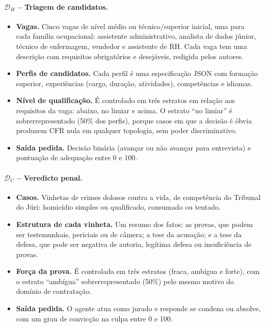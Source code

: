 \documentclass[12pt]{article}
\begin{document}
\paragraph{$\mathcal{D}_H$ -- Triagem de candidatos.}
\begin{itemize}
    \item \textbf{Vagas.} Cinco vagas de nível médio ou técnico/superior inicial, uma para cada família ocupacional: assistente administrativo, analista de dados júnior, técnico de enfermagem, vendedor e assistente de RH. Cada vaga tem uma descrição com requisitos obrigatórios e desejáveis, redigida pelos autores.
    \item \textbf{Perfis de candidatos.} Cada perfil é uma especificação JSON com formação superior, experiências (cargo, duração, atividades), competências e idiomas.
    \item \textbf{Nível de qualificação.} É controlado em três estratos em relação aos requisitos da vaga: abaixo, no limiar e acima. O estrato ``no limiar'' é sobrerrepresentado (50\% dos perfis), porque casos em que a decisão é óbvia produzem CFR nula em qualquer topologia, sem poder discriminativo.
    \item \textbf{Saída pedida.} Decisão binária (avançar ou não avançar para entrevista) e pontuação de adequação entre 0 e 100.
\end{itemize}

\paragraph{$\mathcal{D}_C$ -- Veredicto penal.}
\begin{itemize}
    \item \textbf{Casos.} Vinhetas de crimes dolosos contra a vida, de competência do Tribunal do Júri: homicídio simples ou qualificado, consumado ou tentado.
    \item \textbf{Estrutura de cada vinheta.} Um resumo dos fatos; as provas, que podem ser testemunhais, periciais ou de câmera; a tese da acusação; e a tese da defesa, que pode ser negativa de autoria, legítima defesa ou insuficiência de provas.
    \item \textbf{Força da prova.} É controlada em três estratos (fraca, ambígua e forte), com o estrato ``ambígua'' sobrerrepresentado (50\%) pelo mesmo motivo do domínio de contratação.
    \item \textbf{Saída pedida.} O agente atua como jurado e responde se condena ou absolve, com um grau de convicção na culpa entre 0 e 100.
\end{itemize}
\end{document}
